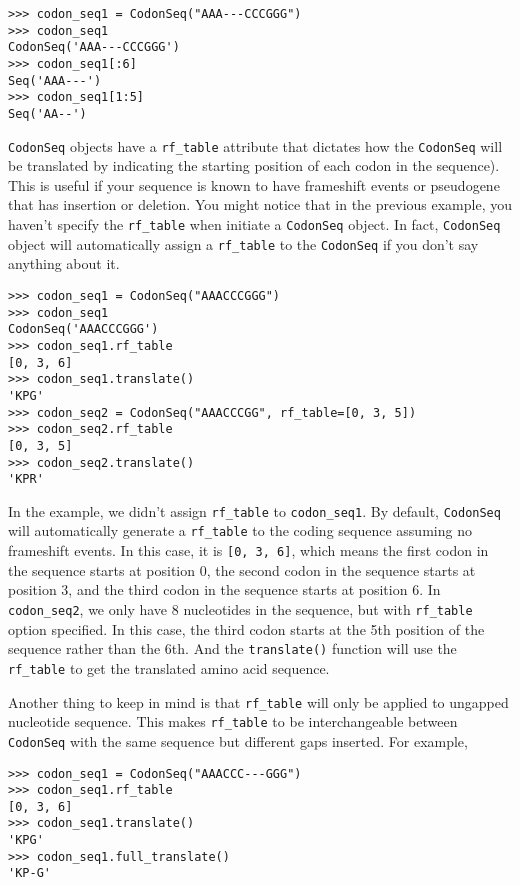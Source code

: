 \documentclass{article}
\begin{document}
\begin{verbatim}
>>> codon_seq1 = CodonSeq("AAA---CCCGGG")
>>> codon_seq1
CodonSeq('AAA---CCCGGG')
>>> codon_seq1[:6]
Seq('AAA---')
>>> codon_seq1[1:5]
Seq('AA--')
\end{verbatim}

\texttt{CodonSeq} objects have a \texttt{rf\_table} attribute that dictates
how the \texttt{CodonSeq} will be translated by indicating the starting
position of each codon in the sequence). This is useful if your sequence is
known to have frameshift events or pseudogene that has
insertion or deletion. You might notice that in the previous example,
you haven't specify the \texttt{rf\_table} when initiate a
\texttt{CodonSeq} object. In fact, \texttt{CodonSeq} object will
automatically assign a \texttt{rf\_table} to the \texttt{CodonSeq} if
you don't say anything about it.

\begin{verbatim}
>>> codon_seq1 = CodonSeq("AAACCCGGG")
>>> codon_seq1
CodonSeq('AAACCCGGG')
>>> codon_seq1.rf_table
[0, 3, 6]
>>> codon_seq1.translate()
'KPG'
>>> codon_seq2 = CodonSeq("AAACCCGG", rf_table=[0, 3, 5])
>>> codon_seq2.rf_table
[0, 3, 5]
>>> codon_seq2.translate()
'KPR'
\end{verbatim}

In the example, we didn't assign \texttt{rf\_table} to
\texttt{codon\_seq1}. By default, \texttt{CodonSeq} will automatically
generate a \texttt{rf\_table} to the coding sequence assuming no
frameshift events. In this case, it is \texttt{{[}0, 3, 6{]}}, which
means the first codon in the sequence starts at position 0, the second
codon in the sequence starts at position 3, and the third codon in the
sequence starts at position 6. In \texttt{codon\_seq2}, we only have 8
nucleotides in the sequence, but with \texttt{rf\_table} option
specified. In this case, the third codon starts at the 5th position of
the sequence rather than the 6th. And the \texttt{translate()} function
will use the \texttt{rf\_table} to get the translated amino acid
sequence.

Another thing to keep in mind is that \texttt{rf\_table} will only be
applied to ungapped nucleotide sequence. This makes \texttt{rf\_table}
to be interchangeable between \texttt{CodonSeq} with the same sequence
but different gaps inserted. For example,

\begin{verbatim}
>>> codon_seq1 = CodonSeq("AAACCC---GGG")
>>> codon_seq1.rf_table
[0, 3, 6]
>>> codon_seq1.translate()
'KPG'
>>> codon_seq1.full_translate()
'KP-G'
\end{verbatim}
\end{document}
